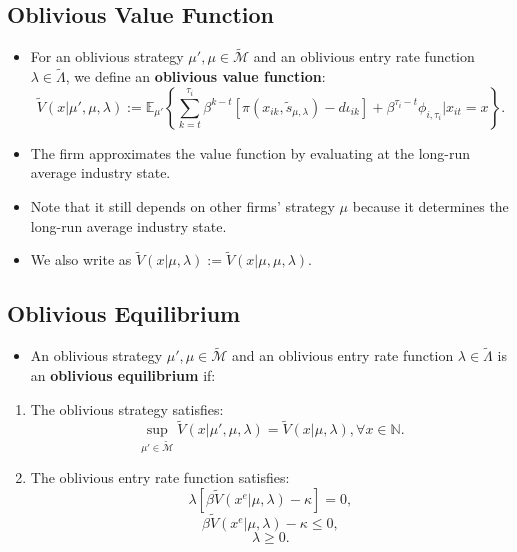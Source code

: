 \documentclass[
]{book}
\providecommand{\tightlist}{%
  \setlength{\itemsep}{0pt}\setlength{\parskip}{0pt}}
\begin{document}
\hypertarget{oblivious-value-function}{%
\subsection{Oblivious Value Function}\label{oblivious-value-function}}

\begin{itemize}
\item
  For an oblivious strategy \(\mu', \mu \in \widetilde{\mathcal{M}}\)
  and an oblivious entry rate function
  \(\lambda \in \widetilde{\Lambda}\), we define an \textbf{oblivious value
  function}: \[
  \widetilde{V}(x|\mu', \mu, \lambda) := \mathbb{E}_{\mu'} \left\{\sum_{k = t}^{\tau_i} \beta^{k - t}[\pi(x_{ik}, \tilde{s}_{\mu, \lambda}) - d \iota_{ik}] + \beta^{\tau_i - t} \phi_{i, \tau_i}| x_{it} = x \right\}.
  \]
\item
  The firm approximates the value function by evaluating at the
  long-run average industry state.
\item
  Note that it still depends on other firms' strategy \(\mu\) because it
  determines the long-run average industry state.
\item
  We also write as
  \(\widetilde{V}(x|\mu, \lambda) := \widetilde{V}(x|\mu, \mu, \lambda)\).
\end{itemize}

\hypertarget{oblivious-equilibrium}{%
\subsection{Oblivious Equilibrium}\label{oblivious-equilibrium}}

\begin{itemize}
\tightlist
\item
  An oblivious strategy \(\mu', \mu \in \widetilde{\mathcal{M}}\) and an
  oblivious entry rate function \(\lambda \in \widetilde{\Lambda}\) is
  an \textbf{oblivious equilibrium} if:
\end{itemize}

\begin{enumerate}
\def\labelenumi{\arabic{enumi}.}
\tightlist
\item
  The oblivious strategy satisfies: \[
  \sup_{\mu'  \in \widetilde{\mathcal{M}}} \widetilde{V}(x|\mu', \mu, \lambda) = \widetilde{V}(x|\mu, \lambda), \forall x \in \mathbb{N}.
  \]
\item
  The oblivious entry rate function satisfies: \[
  \lambda [\beta \widetilde{V}(x^e|\mu, \lambda) - \kappa] = 0,
  \] \[
  \beta \widetilde{V}(x^e|\mu, \lambda) - \kappa \le 0,
  \] \[
  \lambda \ge 0.
  \]
\end{enumerate}
\end{document}
